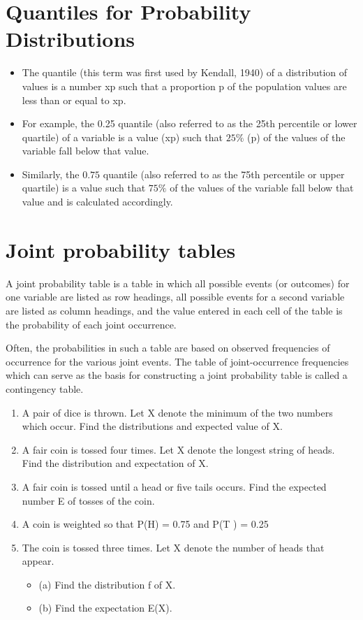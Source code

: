 \documentclass[a4paper,12pt]{article}
\begin{document}


\section{Quantiles for Probability Distributions}
\begin{itemize}
\item The quantile (this term was first used by Kendall, 1940) of a distribution of values is a number xp such that a proportion p of the population values are less than or equal to xp. 

\item For example, the 0.25 quantile (also referred to as the 25th percentile or lower quartile) of a variable is a value (xp) such that $25\%$ (p) of the values of the variable fall below that value.

\item Similarly, the $0.75$ quantile (also referred to as the 75th percentile or upper quartile) is a value such that $75\%$ of the values of the variable fall below that value and is calculated accordingly.
\end{itemize}

\section{Joint probability tables}
A joint probability table is a table in which all possible events (or outcomes) for one variable are listed as
row headings, all possible events for a second variable are listed as column headings, and the value entered in
each cell of the table is the probability of each joint occurrence. 

Often, the probabilities in such a table are based
on observed frequencies of occurrence for the various joint events. The table
of joint-occurrence frequencies which can serve as the basis for constructing a joint probability table is called a
contingency table.

\begin{enumerate}
\item A pair of dice is thrown. Let X denote the minimum of the two numbers which occur.
Find the distributions and expected value of X.

\item A fair coin is tossed four times.
Let X denote the longest string of heads.
Find the distribution and expectation of X.

\item A fair coin is tossed until a head or five tails occurs.
Find the expected number E of tosses of the coin.


\item A coin is weighted so that P(H) = 0.75 and P(T ) = 0.25
\item The coin is tossed three times. Let X denote the number of
heads that appear.
\begin{itemize}
\item (a) Find the distribution f of X.
\item (b) Find the expectation E(X).
\end{itemize}
\end{enumerate}
\end{document}
